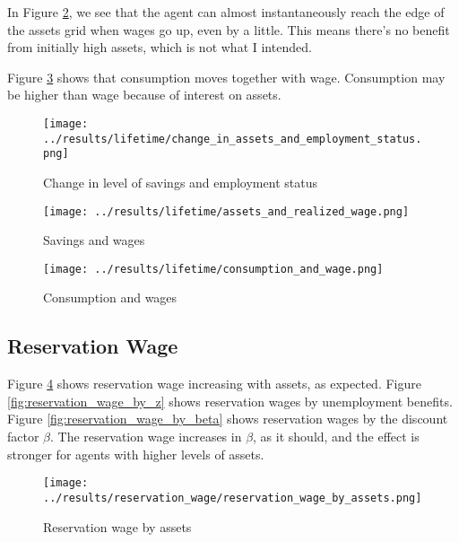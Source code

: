\documentclass[12pt]{article}
\begin{document}
\vspace{5mm}
In Figure \ref{fig:lifetime_assets_and_wage}, we see that the agent can almost instantaneously reach the edge of the assets grid when wages go up, even by a little. This means there's no benefit from initially high assets, which is not what I intended.

\vspace{5mm}
Figure \ref{fig:lifetime_consumption_and_wage} shows that consumption moves together with wage. Consumption may be higher than wage because of interest on assets.


\begin{figure}[hbt!]
\centering
\texttt{[image: ../results/lifetime/change\_in\_assets\_and\_employment\_status.png]}
\caption{Change in level of savings and employment status}
\label{fig:lifetime_change_in_assets_by_employment}
\end{figure}


\begin{figure}[hbt!]
\centering
\texttt{[image: ../results/lifetime/assets\_and\_realized\_wage.png]}
\caption{Savings and wages}
\label{fig:lifetime_assets_and_wage}
\end{figure}


\begin{figure}[hbt!]
\centering
\texttt{[image: ../results/lifetime/consumption\_and\_wage.png]}
\caption{Consumption and wages}
\label{fig:lifetime_consumption_and_wage}
\end{figure}


\clearpage


\subsection{Reservation Wage}

Figure \ref{fig:reservation_wage_by_assets} shows reservation wage increasing with assets, as expected. Figure \ref{fig:reservation_wage_by_z} shows reservation wages by unemployment benefits. Figure \ref{fig:reservation_wage_by_beta} shows reservation wages by the discount factor $\beta$. The reservation wage increases in $\beta$, as it should, and the effect is stronger for agents with higher levels of assets.

\begin{figure}[hbt!]
\centering
\texttt{[image: ../results/reservation\_wage/reservation\_wage\_by\_assets.png]}
\caption{Reservation wage by assets}
\label{fig:reservation_wage_by_assets}
\end{figure}
\end{document}

